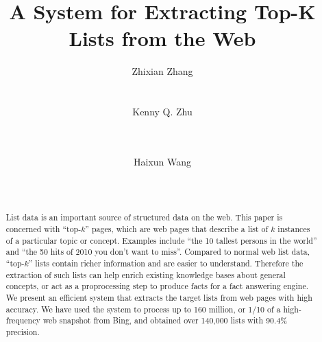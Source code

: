 \documentclass[conference,letterpaper]{sig-alternate}
\begin{document}
\title{A System for Extracting Top-K Lists from the Web}
\author{
\alignauthor
Zhixian Zhang\\
       \\
       \\
\alignauthor
Kenny Q. Zhu \\
       \\
       \\
\and
\alignauthor
Haixun Wang\\
       \\
       \\
}
\maketitle

\begin{abstract}
List data is an important source of structured data on the web. 
This paper is concerned with ``top-$k$'' pages, which are
web pages that describe a list of $k$ instances of a
particular topic or concept. Examples include ``the
10 tallest persons in the world'' and ``the 50 hits of 2010 you 
don't want to miss''. 
Compared to normal web list data, 
``top-$k$'' lists contain richer information and are easier to understand.
Therefore the extraction of such lists can help
enrich existing knowledge bases about general concepts, or
act as a proprocessing step to produce facts for a fact answering engine.
We present an efficient system
that extracts the target lists from web pages with high accuracy.
We have used the system to process up to 160 million, or
1/10 of a high-frequency web snapshot from Bing, and obtained
over 140,000 lists with 90.4\% precision. 
\end{abstract}
\end{document}
